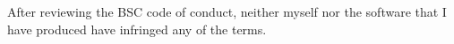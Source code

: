 \documentclass[a4paper,10.5pt]{article}
\begin{document}
After reviewing the BSC code of conduct, neither myself nor the software that I have produced have infringed any of the terms.

















\newpage
\end{document}
